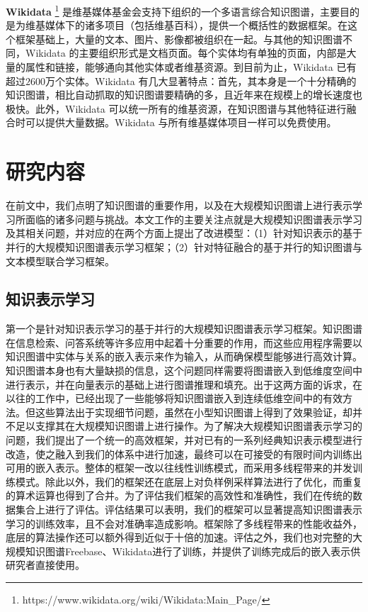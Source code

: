 	\textbf{Wikidata} \footnote{https://www.wikidata.org/wiki/Wikidata:Main\_Page/} 是维基媒体基金会支持下组织的一个多语言综合知识图谱，主要目的是为维基媒体下的诸多项目（包括维基百科），提供一个概括性的数据框架。在这个框架基础上，大量的文本、图片、影像都被组织在一起。与其他的知识图谱不同，Wikidata 的主要组织形式是文档页面。每个实体均有单独的页面，内部是大量的属性和链接，能够通向其他实体或者维基资源。到目前为止，Wikidata 已有超过$2600$万个实体。Wikidata 有几大显著特点：首先，其本身是一个十分精确的知识图谱，相比自动抓取的知识图谱要精确的多，且近年来在规模上的增长速度也极快。此外，Wikidata 可以统一所有的维基资源，在知识图谱与其他特征进行融合时可以提供大量数据。Wikidata 与所有维基媒体项目一样可以免费使用。 


\section{研究内容}

在前文中，我们点明了知识图谱的重要作用，以及在大规模知识图谱上进行表示学习所面临的诸多问题与挑战。本文工作的主要关注点就是大规模知识图谱表示学习及其相关问题，并对应的在两个方面上提出了改进模型：（1）针对知识表示的基于并行的大规模知识图谱表示学习框架；（2）针对特征融合的基于并行的知识图谱与文本模型联合学习框架。

\subsection{知识表示学习}

第一个是针对知识表示学习的基于并行的大规模知识图谱表示学习框架。知识图谱在信息检索、问答系统等许多应用中起着十分重要的作用，而这些应用程序需要以知识图谱中实体与关系的嵌入表示来作为输入，从而确保模型能够进行高效计算。知识图谱本身也有大量缺损的信息，这个问题同样需要将图谱嵌入到低维度空间中进行表示，并在向量表示的基础上进行图谱推理和填充。出于这两方面的诉求，在以往的工作中，已经出现了一些能够将知识图谱嵌入到连续低维空间中的有效方法。但这些算法出于实现细节问题，虽然在小型知识图谱上得到了效果验证，却并不足以支撑其在大规模知识图谱上进行操作。为了解决大规模知识图谱表示学习的问题，我们提出了一个统一的高效框架，并对已有的一系列经典知识表示模型进行改造，使之融入到我们的体系中进行加速，最终可以在可接受的有限时间内训练出可用的嵌入表示。整体的框架一改以往线性训练模式，而采用多线程带来的并发训练模式。除此以外，我们的框架还在底层上对负样例采样算法进行了优化，而重复的算术运算也得到了合并。为了评估我们框架的高效性和准确性，我们在传统的数据集合上进行了评估。评估结果可以表明，我们的框架可以显著提高知识图谱表示学习的训练效率，且不会对准确率造成影响。框架除了多线程带来的性能收益外，底层的算法操作还可以额外得到近似于十倍的加速。评估之外，我们也对完整的大规模知识图谱Freebase、Wikidata进行了训练，并提供了训练完成后的嵌入表示供研究者直接使用。

